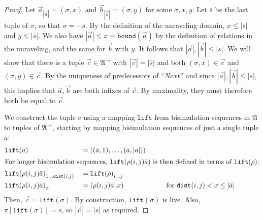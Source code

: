 \documentclass[draft]{scrartcl}
\theoremstyle{definition}
\newcommand{\struct}[1]{\mathfrak{#1}}
\newcommand{\dist}[2]{\mathtt{dist}({#1},{#2})}
\newcommand{\lift}[1]{\mathtt{lift}({#1})}
\begin{document}
\begin{proof}
  Let $\overrightarrow{a}_{|\overrightarrow{a}|} = (\sigma, x)$ and $\overrightarrow{b}_{|\overrightarrow{b}|} = (\sigma, y)$ for some $\sigma, x, y$.
  Let $\bar{s}$ be the last tuple of $\sigma$, so that $\sigma = \cdots{}\bar{s}$.
  By the definition of the unraveling domain, $x \le |\bar{s}|$ and $y \le |\bar{s}|$.
  We also have $|\overrightarrow{a}| \le x = \mathtt{bound}(\overrightarrow{a})$ by the definition of relations in the unraveling, and the same for $\overrightarrow{b}$ with $y$.
  It follows that $|\overrightarrow{a}|, |\overrightarrow{b}| \le |\bar{s}|$.
  We will show that there is a tuple $\overrightarrow{c} \in \struct{A}^{\rightarrow}$ with $|\overrightarrow{c}| = |\bar{s}|$ and both $(\sigma, x) \in \overrightarrow{c}$ and $(\sigma, y) \in \overrightarrow{c}$.
  By the uniqueness of predecessors of ``$\mathit{Next}$'' and since $|\overrightarrow{a}|, |\overrightarrow{b}| \le |\bar{s}|$, this implies that $\overrightarrow{a}, \overrightarrow{b}$ are both infixes of $\overrightarrow{c}$.
  By maximality, they must therefore both be equal to $\overrightarrow{c}$.

  We construct the tuple $\bar{c}$ using a mapping $\mathtt{lift}$ from bisimulation sequences in $\struct{A}$ to tuples of $\struct{A}^{\rightarrow}$, starting by mapping bisimulation sequences of just a single tuple $\bar{a}$:
  \begin{alignat*}{3}
    &\lift{\bar{a}} &&= ((\bar{a}, 1), \ldots{}, (\bar{a}, |a|)) \\
    \intertext{For longer bisimulation sequences, $\lift{\rho(i,j)\bar{a}}$ is then defined in terms of $\lift{\rho}$:}
    &{\lift{\rho(i,j)\bar{a}}}_{1\ldots{}\dist{i}{j}} &&= {\lift{\rho}}_{i\ldots{}j} && \\
    &{\lift{\rho(i,j)\bar{a}}}_{x} &&= (\rho(i,j)\bar{a}, x) && \qquad\text{for $\dist{i}{j} < x \le |\bar{a}|$}
  \end{alignat*}
  Then, $\overrightarrow{c} = \lift{\sigma}$.
  By construction, $\lift{\sigma}$ is live.
  Also, $\pi[\lift{\sigma}] = \bar{s}$, so $|\overrightarrow{c}| = |\bar{s}|$ as required.
\end{proof}
\end{document}
